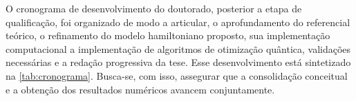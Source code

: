     O cronograma de desenvolvimento do doutorado, posterior a etapa de qualificação, foi organizado de modo a articular, o aprofundamento do referencial teórico, o refinamento do modelo hamiltoniano proposto, sua implementação computacional a implementação de algoritmos de otimização quântica, validações necessárias e a redação progressiva da tese. Esse desenvolvimento está sintetizado na \autoref{tab:cronograma}. Busca-se, com isso, assegurar que a consolidação conceitual e a obtenção dos resultados numéricos avancem conjuntamente.

    \begin{table}[!htb]
    \centering
    \caption{Cronograma de execução das atividades}
    \label{tab:cronograma}
    \end{table}